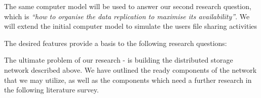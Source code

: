The same computer model will be used to answer our second research 
question, which is \emph{``how to organise the data replication to maximise
its availability''}. We will extend the initial computer model to simulate
the users file sharing activities 

The desired features provide a basis to the following research questions:


The ultimate problem of our research - is building the distributed
storage network described above. We have outlined the ready
components of the network that we may utilize, as well as the
components which need a further research in the following literature
survey.







